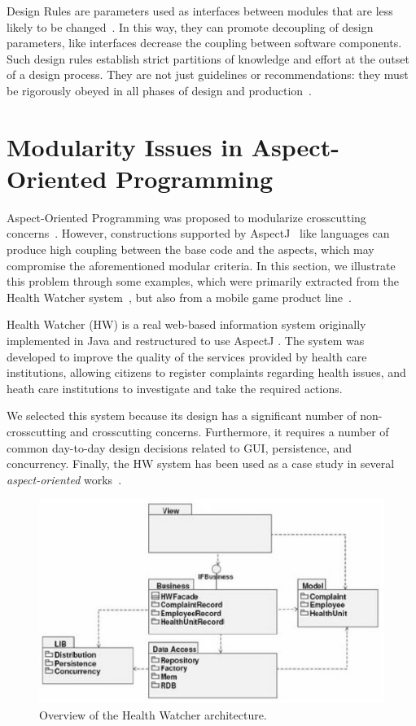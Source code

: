 Design Rules are parameters used as interfaces between modules that are less
likely to be changed~\cite{lopes-taosd-2006}. In this way, they can promote decoupling
of design parameters, like interfaces decrease the coupling between software
components. Such design rules establish strict partitions of knowledge and effort at the
outset of a design process. They are not just guidelines or recommendations: they must
be rigorously obeyed in all phases of design and production~\cite{clark-design-rules-book}.

\section{Modularity Issues in Aspect-Oriented Programming}\label{sec:aop-issues}

Aspect-Oriented Programming was proposed to modularize crosscutting
concerns~\cite{kiczales-ecoop-1997}. However, constructions supported by
AspectJ~\cite{kiczales-cacm-2001} like languages can produce high
coupling between the base code and the aspects, which may compromise
the aforementioned modular criteria. In this section, we illustrate
this problem through some examples, which were primarily extracted from 
the Health Watcher system~\cite{soares-oopsla-02}, but also from a mobile 
game product line~\cite{a}.

Health Watcher (HW) is a real web-based information system
originally implemented in Java and restructured to use AspectJ
\cite{kiczales-cacm-2001}. The system was developed to improve the quality
of the services provided by health care institutions, allowing citizens
to register complaints regarding health issues, and heath care
institutions to investigate and take the required actions. 

We  selected this system because 
its design has a significant number of non-crosscutting and crosscutting concerns. 
Furthermore, it requires a number of common day-to-day design decisions related
to GUI, persistence, and concurrency. Finally, the HW system has been used
as a case study in several \emph{aspect-oriented} works~\cite{greenwood-ecoop-2007, greenwood-ea-2007, soares-oopsla-02}. 

\begin{figure}[t]
\centering
\includegraphics[scale=0.5]{images/hw.eps}
\caption{Overview of the Health Watcher architecture.}
\label{fig:hw-architecture}
\end{figure}

